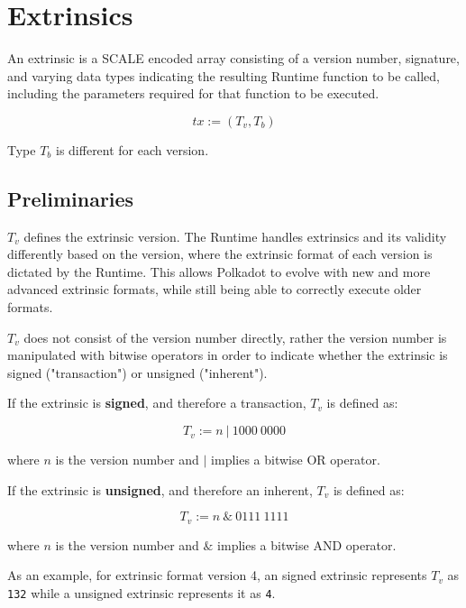 \newpage
\section{Extrinsics}

An extrinsic is a SCALE encoded array consisting of a version number,
signature, and varying data types indicating the resulting Runtime function to
be called, including the parameters required for that function to be executed.
\newline

\[
    tx := (T_v, T_b)
\]

Type $T_b$ is different for each version.

\subsection{Preliminaries}

\begin{definition}
    \label{defn-extrinsic-version}
    $T_v$ defines the extrinsic version. The Runtime handles extrinsics and
    its validity differently based on the version, where the extrinsic format
    of each version is dictated by the Runtime. This allows Polkadot to evolve
    with new and more advanced extrinsic formats, while still being able to
    correctly execute older formats.
    \newline

    $T_v$ does not consist of the version number directly, rather the version
    number is manipulated with bitwise operators in order to indicate whether
    the extrinsic is signed ("transaction") or unsigned ("inherent").
    \newline

    If the extrinsic is \textbf{signed}, and therefore a transaction, $T_v$ is
    defined as:

    \[
        T_v := n \ | \ 1000 \ 0000
    \]

    where $n$ is the version number and $|$ implies a bitwise OR operator.
    \newline

    If the extrinsic is \textbf{unsigned}, and therefore an inherent, $T_v$ is
    defined as:

    \[
        T_v := n \ \& \ 0111 \ 1111
    \]

    where $n$ is the version number and $\&$ implies a bitwise AND operator.
    \newline

    As an example, for extrinsic format version 4, an signed extrinsic
    represents $T_v$ as \verb|132| while a unsigned extrinsic represents it as
    \verb|4|.
\end{definition}

